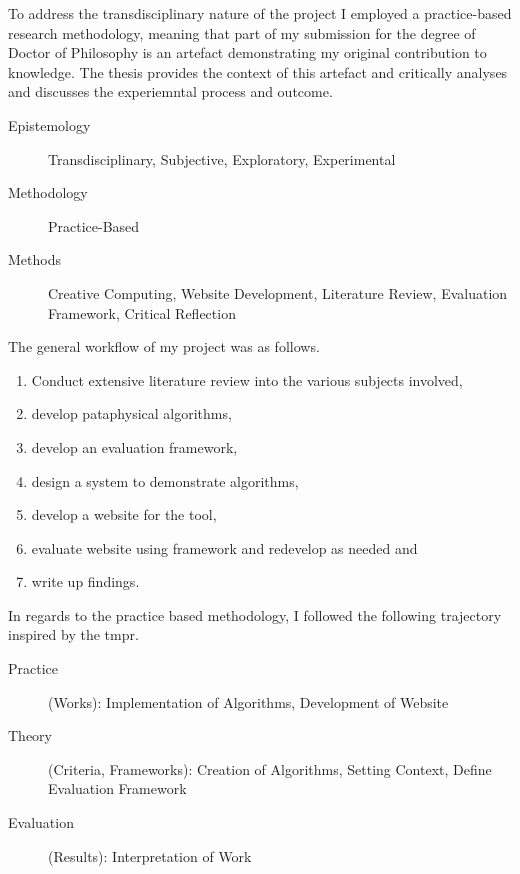 To address the transdisciplinary nature of the project I employed a practice-based research methodology, meaning that part of my submission for the degree of Doctor of Philosophy is an artefact demonstrating my original contribution to knowledge. The thesis provides the context of this artefact and critically analyses and discusses the experiemntal process and outcome.

\begin{description}
  \item [Epistemology] Transdisciplinary, Subjective, Exploratory, Experimental
  \item [Methodology] Practice-Based
  \item [Methods] Creative Computing, Website Development, Literature Review, Evaluation Framework, Critical Reflection
\end{description}

The general workflow of my project was as follows.

\begin{enumerate}
  \item Conduct extensive literature review into the various subjects involved,
  \item develop pataphysical algorithms,
  \item develop an evaluation framework,
  \item design a system to demonstrate algorithms,
  \item develop a website for the tool,
  \item evaluate website using framework and redevelop as needed and
  \item write up findings.
\end{enumerate}

In regards to the practice based methodology, I followed the following trajectory inspired by the \gls{tmpr}.


\begin{description}
  \item [Practice] (Works): Implementation of Algorithms, Development of Website
  \item [Theory] (Criteria, Frameworks): Creation of Algorithms, Setting Context, Define Evaluation Framework
  \item [Evaluation] (Results): Interpretation of Work
\end{description}

\stopcontents[chapters]
